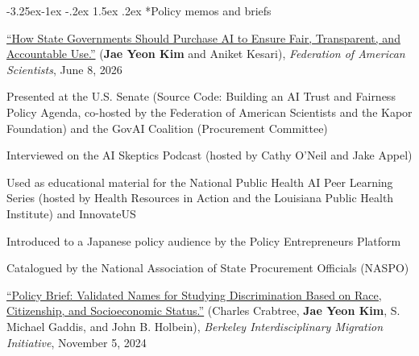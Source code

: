 \documentclass[10pt, letterpaper]{article}
\makeatletter
\renewcommand\subsection{\@startsection{subsection}{2}{\z@}%
  {-3.25ex\@plus -1ex \@minus -.2ex}%
  {1.5ex \@plus .2ex}%
  {\normalfont\large\bfseries\color{cvnavy}}}
\renewenvironment{itemize}{
\begin{list}{}{
        \setlength{\leftmargin}{1.5em}
        \setlength{\itemsep}{0.10em}
        \setlength{\parskip}{0pt}
        \setlength{\parsep}{0.10em}
    }
}{
\end{list}
}
\makeatother
\begin{document}

\subsection*{Policy memos and briefs} 
\begin{etaremune}
    \item \href{https://fas.org/publication/how-governments-purchase-ai-fair/}{``How State Governments Should Purchase AI to Ensure Fair, Transparent, and Accountable Use.''} (\textbf{Jae Yeon Kim} and Aniket Kesari), \textit{Federation of American Scientists}, June 8, 2026
    \begin{itemize}
        \item Presented at the U.S. Senate (Source Code: Building an AI Trust and Fairness Policy Agenda, co-hosted by the Federation of American Scientists and the Kapor Foundation) and the GovAI Coalition (Procurement Committee)
        \item Interviewed on the AI Skeptics Podcast (hosted by Cathy O’Neil and Jake Appel)
        \item Used as educational material for the National Public Health AI Peer Learning Series (hosted by Health Resources in Action and the Louisiana Public Health Institute) and InnovateUS
        \item Introduced to a Japanese policy audience by the Policy Entrepreneurs Platform
        \item Catalogued by the National Association of State Procurement Officials (NASPO)
    \end{itemize}
    \item \href{https://bimi.berkeley.edu/sites/default/files/bimi_policy_brief_crabtree_validated_names.pdf}{``Policy Brief: Validated Names for Studying Discrimination Based on Race, Citizenship, and Socioeconomic Status.''} (Charles Crabtree, \textbf{Jae Yeon Kim}, S. Michael Gaddis, and John B. Holbein), \textit{Berkeley Interdisciplinary Migration Initiative}, November 5, 2024 
\end{etaremune}
\end{document}
